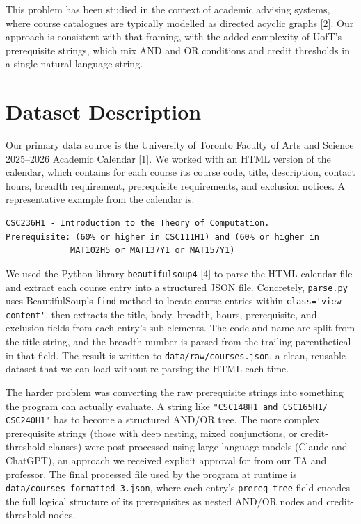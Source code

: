 \documentclass[11pt]{article}
\begin{document}
This problem has been studied in the context of academic advising systems, where course
catalogues are typically modelled as directed acyclic graphs [2]. Our approach is consistent
with that framing, with the added complexity of UofT's prerequisite strings, which mix AND
and OR conditions and credit thresholds in a single natural-language string.

\section*{Dataset Description}

Our primary data source is the University of Toronto Faculty of Arts and Science 2025--2026
Academic Calendar [1]. We worked with an HTML version of the calendar, which contains for
each course its course code, title, description, contact hours, breadth requirement,
prerequisite requirements, and exclusion notices. A representative example from the calendar
is:

\begin{verbatim}
CSC236H1 - Introduction to the Theory of Computation.
Prerequisite: (60% or higher in CSC111H1) and (60% or higher in
             MAT102H5 or MAT137Y1 or MAT157Y1)
\end{verbatim}

We used the Python library \verb|beautifulsoup4| [4] to parse the HTML calendar file and
extract each course entry into a structured JSON file. Concretely, \verb|parse.py| uses
BeautifulSoup's \verb|find| method to locate course entries within \verb|class='view-content'|,
then extracts the title, body, breadth, hours, prerequisite, and exclusion fields from each
entry's sub-elements. The code and name are split from the title string, and the breadth
number is parsed from the trailing parenthetical in that field. The result is written to
\verb|data/raw/courses.json|, a clean, reusable dataset that we can load without
re-parsing the HTML each time.

The harder problem was converting the raw prerequisite strings into something the program can
actually evaluate. A string like \verb|"CSC148H1 and CSC165H1/ CSC240H1"| has to become a
structured AND/OR tree. The more complex prerequisite strings (those with deep nesting,
mixed conjunctions, or credit-threshold clauses) were post-processed using large language
models (Claude and ChatGPT), an approach we received explicit approval for from our TA and
professor. The final processed file used by the program at runtime is
\verb|data/courses_formatted_3.json|, where each entry's \verb|prereq_tree| field encodes
the full logical structure of its prerequisites as nested AND/OR nodes and credit-threshold
nodes.
\end{document}
